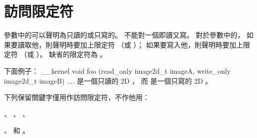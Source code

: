\section{訪問限定符}

參數中的可以聲明為只讀的或只寫的。
不能對一個即讀又寫。
對於參數中的，
如果要讀取他，則聲明時要加上限定符  （或 ）；
如果要寫入他，則聲明時要加上限定符  （或 ）。
缺省的限定符為 。

下面例子：
\startclc
__kernel void foo (read_only image2d_t imageA,
		   write_only image2d_t imageB)
{
	....
}
\stopclc
{} 是一個只讀的 2D ，
而  是一個只寫的 2D 。

下列保留關鍵字僅用作訪問限定符，不作他用：
\startigBase
\item {}、 、 、
\item {}、  和 。
\stopigBase
